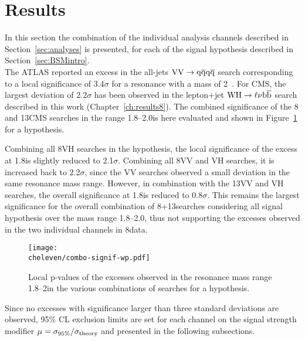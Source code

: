 \section{Results}\label{sec:comboResults}

In this section the combination of the individual analysis channels described in Section~\ref{sec:analyses} is presented, for each of the signal hypothesis described in Section~\ref{sec:BSMintro}.\\

The ATLAS reported an excess in the all-jets $\mathrm{V}\mathrm{V}\to\mathrm{q}\overline{\mathrm{q}}\mathrm{q}\overline{\mathrm{q}}$ search corresponding to a local significance of 3.4$\sigma$ for a \Wpr resonance with a mass of 2\TeV~\cite{Aad:2015owa}. For CMS, the largest deviation of 2.2$\sigma$ has been observed in the lepton+jet $\mathrm{W}\mathrm{H}\to\ell\nu{\mathrm{b}\overline{\mathrm{b}}}$ search described in this work (Chapter~\ref{ch:results8}).
The combined significance of the 8 and 13\TeV CMS searches in the range 1.8--2.0\TeV is here evaluated and shown in Figure~\ref{fig:comboSignif} for a \Wpr hypothesis.

Combining all 8\TeV VH searches in the \Wpr hypothesis, the local significance of the excess at 1.8\TeV is slightly reduced to 2.1$\sigma$.
Combining all 8\TeV VV and VH searches, it is increased back to 2.2$\sigma$, since the VV searches observed a small deviation in the same resonance mass range.
However, in combination with the 13\TeV VV and VH searches, the overall significance at 1.8\TeV is reduced to 0.8$\sigma$.
This remains the largest significance for the overall combination of 8+13\TeV searches considering all signal hypothesis over the mass range 1.8--2.0\TeV,
thus not supporting the excesses observed in the two individual channels in 8\TeV data.

\begin{figure}[!htb]
\centering
\texttt{[image: \\cheleven/combo-signif-wp.pdf]}
\caption{Local p-values of the excesses observed in the resonance mass range 1.8--2\TeV in the various combinations of searches for a \Wpr hypothesis.}
\label{fig:comboSignif}
\end{figure}

Since no excesses with significance larger than three standard deviations are observed, 95\% CL exclusion limits are set for each channel  
on the signal strength modifier $\mu = \sigma_{95\%}/\sigma_{\rm theory}$ and presented in the following subsections.


